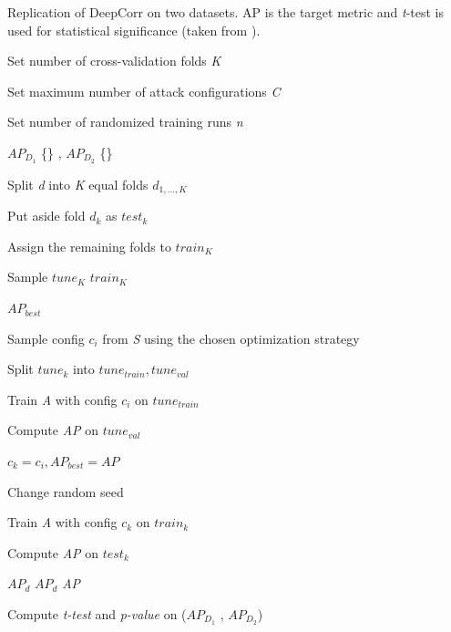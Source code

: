 \documentclass[sigconf]{acmart}
\begin{document}
\begin{algorithm}
\caption{Replication of DeepCorr on two datasets. AP is the target metric and \textit{t}-test is used for statistical significance (taken from \cite{RimmerV}).}
\label{alg:replication}
Set number of cross-validation folds \emph{K}

Set maximum number of attack configurations \emph{C}

Set number of randomized training runs \emph{n}

$AP_{D_1}$ \gets \{\} ,  \State $AP_{D_2}$ \gets \{\}
\DontPrintSemicolon
{}
\BlankLine

    
 {

    Split \emph{d} into \emph{K} equal folds $d_{1,...,K}$
    
     {
        Put aside fold $d_{k}$ as $test_{k}$

        Assign the remaining folds to $train_{K}$

        Sample $tune_{K}$  \subseteq  $train_{K}$

        \State $AP_{best}$  
    
         {
            Sample config $c_{i}$ from \emph{S} using the chosen optimization strategy

            Split $tune_{k}$ into $tune_{train} , tune_{val}$ 

            Train \emph{A} with config $c_{i}$ on $tune_{train}$

            Compute \emph{AP} on $tune_{val}$

             {
                $c_{k} = c_{i} , AP_{best} = AP $
            }
        }
         {
        
            Change random seed
            
            Train \emph{A} with config $c_{k}$ on $train_{k}$
            
            Compute \emph{AP} on $test_{k}$
            
            \State $AP_{d}$ \gets $AP_{d}$ \cup \emph{AP} 
        }
        
    }
}

Compute \emph{t-test} and \emph{p-value} on ($AP_{D_1}$ , $AP_{D_2}$)

\end{algorithm}
\end{document}
